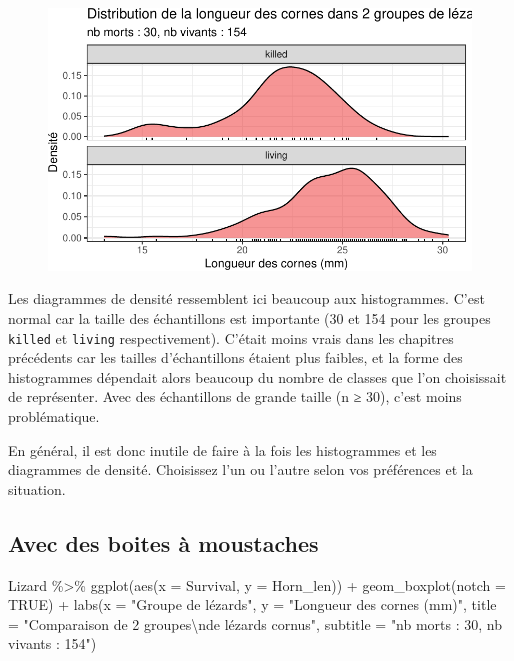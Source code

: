 \documentclass[
  a4paper,
  DIV=11,
  numbers=noendperiod,
  oneside]{scrreprt}
\newenvironment{Shaded}{}{}
\newcommand{\AttributeTok}[1]{\textcolor[rgb]{0.84,0.23,0.29}{#1}}
\newcommand{\ConstantTok}[1]{\textcolor[rgb]{0.00,0.36,0.77}{#1}}
\newcommand{\FunctionTok}[1]{\textcolor[rgb]{0.44,0.26,0.76}{#1}}
\newcommand{\NormalTok}[1]{\textcolor[rgb]{0.14,0.16,0.18}{#1}}
\newcommand{\SpecialCharTok}[1]{\textcolor[rgb]{0.00,0.36,0.77}{#1}}
\newcommand{\StringTok}[1]{\textcolor[rgb]{0.01,0.18,0.38}{#1}}
\begin{document}
\begin{figure}[H]

{\centering \includegraphics{03-TwoSampleTests_files/figure-pdf/unnamed-chunk-13-1.pdf}

}

\end{figure}

Les diagrammes de densité ressemblent ici beaucoup aux histogrammes.
C'est normal car la taille des échantillons est importante (30 et 154
pour les groupes \texttt{killed} et \texttt{living} respectivement).
C'était moins vrais dans les chapitres précédents car les tailles
d'échantillons étaient plus faibles, et la forme des histogrammes
dépendait alors beaucoup du nombre de classes que l'on choisissait de
représenter. Avec des échantillons de grande taille (n ≥ 30), c'est
moins problématique.

En général, il est donc inutile de faire à la fois les histogrammes et
les diagrammes de densité. Choisissez l'un ou l'autre selon vos
préférences et la situation.

\hypertarget{avec-des-boites-uxe0-moustaches}{%
\subsection{Avec des boites à
moustaches}\label{avec-des-boites-uxe0-moustaches}}

\begin{Shaded}
\begin{Highlighting}[]
\NormalTok{Lizard }\SpecialCharTok{\%\textgreater{}\%}
  \FunctionTok{ggplot}\NormalTok{(}\FunctionTok{aes}\NormalTok{(}\AttributeTok{x =}\NormalTok{ Survival, }\AttributeTok{y =}\NormalTok{ Horn\_len)) }\SpecialCharTok{+}
  \FunctionTok{geom\_boxplot}\NormalTok{(}\AttributeTok{notch =} \ConstantTok{TRUE}\NormalTok{) }\SpecialCharTok{+}
  \FunctionTok{labs}\NormalTok{(}\AttributeTok{x =} \StringTok{"Groupe de lézards"}\NormalTok{,}
       \AttributeTok{y =} \StringTok{"Longueur des cornes (mm)"}\NormalTok{,}
       \AttributeTok{title =} \StringTok{"Comparaison de 2 groupes}\SpecialCharTok{\textbackslash{}n}\StringTok{de lézards cornus"}\NormalTok{,}
       \AttributeTok{subtitle =} \StringTok{"nb morts : 30, nb vivants : 154"}\NormalTok{)}
\end{Highlighting}
\end{Shaded}
\end{document}
